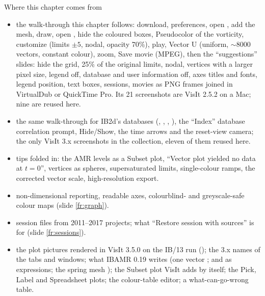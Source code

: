 \documentclass[aspectratio=169,11pt]{beamer}
\begin{document}
\begin{frame}{Where this chapter comes from}
\label{fr:sources}
\scriptsize
\begin{itemize}
  \item {} the walk-through this chapter follows: download, preferences, open , add the mesh, draw, open , hide the coloured boxes, Pseudocolor of the vorticity, customize (limits $\pm5$, nodal, opacity 70\%), play, Vector U (uniform, $\sim$8000 vectors, constant colour), zoom, Save movie (MPEG), then the ``suggestions'' slides: hide the grid, 25\% of the original limits, nodal, vertices with a larger pixel size, legend off, database and user information off, axes titles and fonts, legend position, text boxes, sessions, movies as PNG frames joined in VirtualDub or QuickTime Pro. Its 21 screenshots are VisIt 2.5.2 on a Mac; nine are reused here.
  \item {} the same walk-through for IB2d's  databases (, , , ), the ``Index'' database correlation prompt, Hide/Show, the time arrows and the reset-view camera; the only VisIt 3.x screenshots in the collection, eleven of them reused here.
  \item {} tips folded in: the AMR levels as a Subset plot, ``Vector plot yielded no data at $t = 0$'', vertices as spheres, supersaturated limits, single-colour ramps, the corrected vector scale, high-resolution export.
  \item {} non-dimensional reporting, readable axes, colourblind- and greyscale-safe colour maps (slide \ref{fr:graph}).
  \item {} session files from 2011--2017 projects; what ``Restore session with sources'' is for (slide \ref{fr:sessions}).
  \item {} the plot pictures rendered in VisIt 3.5.0 on the IB/13 run (); the 3.x names of the tabs and windows; what IBAMR 0.19 writes (one vector ;  and  as expressions; the spring mesh ); the Subset plot VisIt adds by itself; the Pick, Label and Spreadsheet plots; the colour-table editor; a what-can-go-wrong table.
\end{itemize}
\end{frame}
\end{document}
